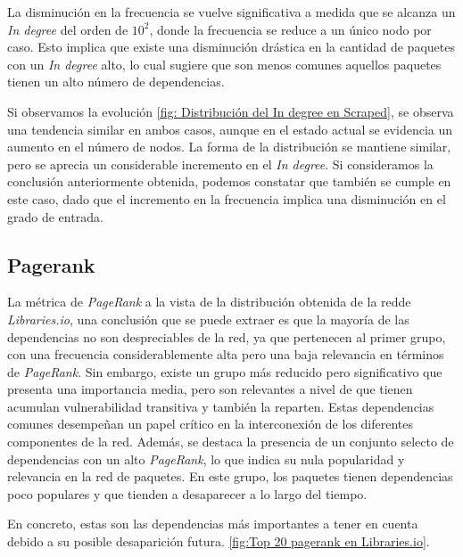 La disminución en la frecuencia se vuelve significativa a medida que se alcanza un \textit{In degree} del orden
de $10^2$, donde la frecuencia se reduce a un único nodo por caso. Esto implica que existe una disminución drástica
en la cantidad de paquetes con un \textit{In degree} alto, lo cual sugiere que son menos comunes aquellos paquetes
tienen un alto número de dependencias.

Si observamos la evolución \ref{fig: Distribución del In degree en Scraped}, se observa una tendencia similar en ambos casos,
aunque en el estado actual se evidencia un aumento en el número de nodos. La forma de la distribución se mantiene similar,
pero se aprecia un considerable incremento en el \textit{In degree}. Si consideramos la conclusión anteriormente obtenida, podemos constatar que
también se cumple en este caso, dado que el incremento en la frecuencia implica una disminución en el grado de entrada.

\subsection{Pagerank}

La métrica de \textit{PageRank} a la vista de la distribución obtenida de la redde \textit{Libraries.io}, una conclusión
que se puede extraer es que la mayoría de las dependencias no son despreciables de la red, ya que pertenecen al primer grupo,
con una frecuencia considerablemente alta pero una baja relevancia en términos de \textit{PageRank}. Sin embargo,
existe un grupo más reducido pero significativo que presenta una importancia media, pero son relevantes a nivel de que
tienen acumulan vulnerabilidad transitiva y también la reparten. Estas dependencias comunes desempeñan un papel crítico
en la interconexión de los diferentes componentes de la red.
Además, se destaca la presencia de un conjunto selecto de dependencias con un alto \textit{PageRank}, lo que indica su nula popularidad
y relevancia en la red de paquetes. En este grupo, los paquetes tienen dependencias poco populares y que tienden a desaparecer a lo largo del tiempo.

En concreto, estas son las dependencias más importantes a tener en cuenta debido a su posible desaparición futura. \ref{fig:Top 20 pagerank en Libraries.io}.

